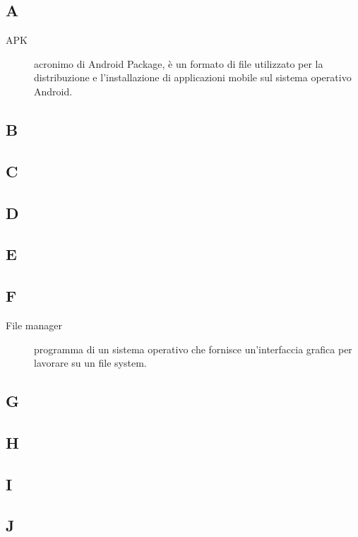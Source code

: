 \documentclass[../manuale-utente.tex]{subfiles}
\begin{document}
\subsection{A}
\begin{description}
    \item[APK] acronimo di Android Package, è un formato di file utilizzato per la distribuzione e l'installazione di applicazioni mobile sul sistema operativo Android.
\end{description}

\subsection{B}

\subsection{C}

\subsection{D}

\subsection{E}

\subsection{F}
\begin{description}
    \item[File manager] programma di un sistema operativo che fornisce un'interfaccia grafica per lavorare su un file system.
\end{description}

\subsection{G}

\subsection{H}

\subsection{I}

\subsection{J}
\end{document}
